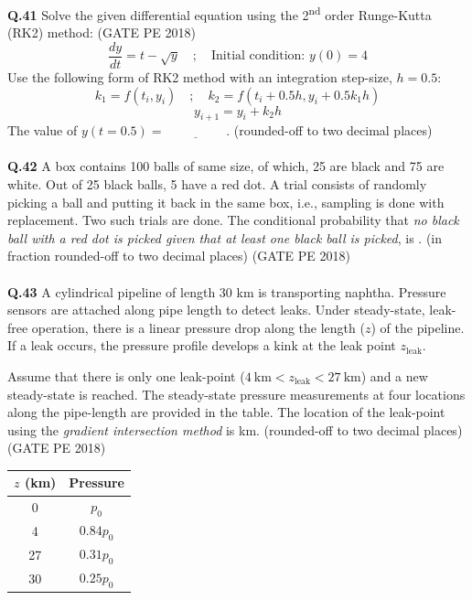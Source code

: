 \documentclass[15pt,a4paper]{article}
\begin{document}
\pagebreak

\noindent\textbf{Q.41} Solve the given differential equation using the 2\textsuperscript{nd} order Runge-Kutta (RK2) method: \hfill (GATE PE 2018)
\[ \frac{dy}{dt} = t - \sqrt{y} \quad ; \quad \text{Initial condition: } y(0) = 4 \]
Use the following form of RK2 method with an integration step-size, $h = 0.5$:
\[ k_1 = f(t_i, y_i) \quad ; \quad k_2 = f(t_i + 0.5h, y_i + 0.5k_1 h) \]
\[ y_{i+1} = y_i + k_2 h \]
The value of $y(t = 0.5) = \underline{\hspace{2cm}}$. (rounded-off to two decimal places)\\\\

\noindent\textbf{Q.42} A box contains 100 balls of same size, of which, 25 are black and 75 are white. Out of 25 black balls, 5 have a red dot. A trial consists of randomly picking a ball and putting it back in the same box, i.e., sampling is done with replacement. Two such trials are done. The conditional probability that \textit{no black ball with a red dot is picked given that at least one black ball is picked}, is \underline{\hspace{2cm}}. (in fraction rounded-off to two decimal places) \hfill (GATE PE 2018)\\\\



\noindent\textbf{Q.43} A cylindrical pipeline of length 30 km is transporting naphtha. Pressure sensors are attached along pipe length to detect leaks. Under steady-state, leak-free operation, there is a linear pressure drop along the length ($z$) of the pipeline. If a leak occurs, the pressure profile develops a kink at the leak point $z_{\text{leak}}$.

\vspace{0.2cm}
Assume that there is only one leak-point ($4~\text{km} < z_{\text{leak}} < 27~\text{km}$) and a new steady-state is reached. The steady-state pressure measurements at four locations along the pipe-length are provided in the table. The location of the leak-point using the \textit{gradient intersection method} is \underline{\hspace{2cm}} km. (rounded-off to two decimal places) \hfill (GATE PE 2018)

\vspace{0.3cm}
\begin{tabular}{|c|c|}
\hline
$z$ (km) & Pressure \\
\hline
0 & $p_0$ \\
4 & $0.84p_0$ \\
27 & $0.31p_0$ \\
30 & $0.25p_0$ \\
\hline
\end{tabular}
\pagebreak
\end{document}
